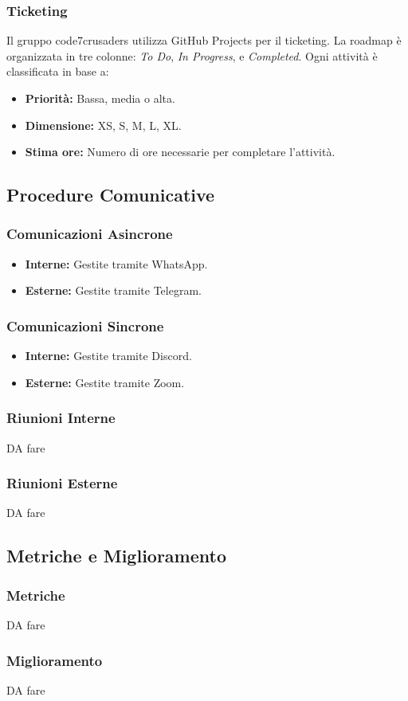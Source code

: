 \subsubsection{Ticketing}
Il gruppo code7crusaders utilizza GitHub Projects per il ticketing. La roadmap è organizzata in tre colonne: \textit{To Do}, \textit{In Progress}, e \textit{Completed}. Ogni attività è classificata in base a:
\begin{itemize}
    \item \textbf{Priorità:} Bassa, media o alta.
    \item \textbf{Dimensione:} XS, S, M, L, XL.
    \item \textbf{Stima ore:} Numero di ore necessarie per completare l’attività.
\end{itemize}

\subsection{Procedure Comunicative}

\subsubsection{Comunicazioni Asincrone}
\begin{itemize}
    \item \textbf{Interne:} Gestite tramite WhatsApp.
    \item \textbf{Esterne:} Gestite tramite Telegram.
\end{itemize}

\subsubsection{Comunicazioni Sincrone}
\begin{itemize}
    \item \textbf{Interne:} Gestite tramite Discord.
    \item \textbf{Esterne:} Gestite tramite Zoom.
\end{itemize}

\subsubsection{Riunioni Interne}
DA fare
\subsubsection{Riunioni Esterne}
DA fare

\subsection{Metriche e Miglioramento}

\subsubsection{Metriche}
DA fare

\subsubsection{Miglioramento}
DA fare
